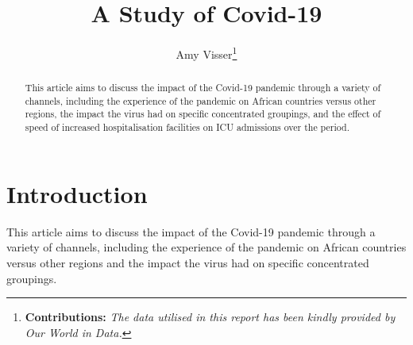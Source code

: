 \documentclass[11pt,preprint, authoryear]{elsarticle}
\numberwithin{equation}{section}
\numberwithin{figure}{section}
\numberwithin{table}{section}
\let\rmarkdownfootnote\footnote%
\def\footnote{\protect\rmarkdownfootnote}
\begin{document}
\begin{frontmatter}  %

\title{A Study of Covid-19}





\author[Add1]{Amy Visser\footnote{\textbf{Contributions:}
  \newline \emph{The data utilised in this report has been kindly
  provided by Our World in Data.}}}
\ead{}





\address[Add1]{Stellenbosch University, South Africa}


\begin{abstract}
\small{
This article aims to discuss the impact of the Covid-19 pandemic through
a variety of channels, including the experience of the pandemic on
African countries versus other regions, the impact the virus had on
specific concentrated groupings, and the effect of speed of increased
hospitalisation facilities on ICU admissions over the period.
}
\end{abstract}

\vspace{1cm}





\vspace{0.5cm}

\end{frontmatter}

\setcounter{footnote}{0}



\pagestyle{fancy}
\chead{}
\rhead{}
\lfoot{}
\lhead{}
\cfoot{}


\headsep 35pt %




\hypertarget{introduction}{%
\section{\texorpdfstring{Introduction
\label{Introduction}}{Introduction }}\label{introduction}}

This article aims to discuss the impact of the Covid-19 pandemic through
a variety of channels, including the experience of the pandemic on
African countries versus other regions and the impact the virus had on
specific concentrated groupings.
\end{document}
